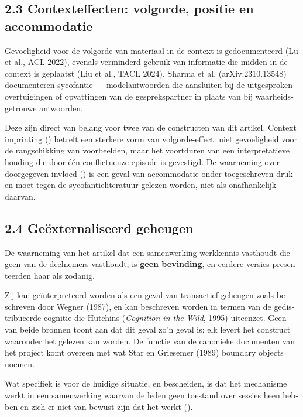 \begin{dutch}
\subsection*{2.3 Contexteffecten: volgorde, positie en accommodatie}
\label{sec:nl:2.3}

\gcheck{} Gevoeligheid voor de volgorde van materiaal in de context is gedocumenteerd (Lu et al., ACL 2022), evenals verminderd gebruik van informatie die midden in de context is geplaatst (Liu et al., TACL 2024). \gcheck{} Sharma et al. (arXiv:2310.13548) documenteren sycofantie — modelantwoorden die aansluiten bij de uitgesproken overtuigingen of opvattingen van de gesprekspartner in plaats van bij waarheidsgetrouwe antwoorden.

Deze zijn direct van belang voor twee van de constructen van dit artikel. Context imprinting () betreft een sterkere vorm van volgorde-effect: niet gevoeligheid voor de rangschikking van voorbeelden, maar het voortduren van een interpretatieve houding die door één conflictueuze episode is gevestigd. De waarneming over doorgegeven invloed () is een geval van accommodatie onder toegeschreven druk en moet tegen de sycofantieliteratuur gelezen worden, niet als onafhankelijk daarvan.


\subsection*{2.4 Geëxternaliseerd geheugen}
\label{sec:nl:2.4}

De waarneming van het artikel dat een samenwerking werkkennis vasthoudt die geen van de deelnemers vasthoudt, is \textbf{geen bevinding}, en eerdere versies presenteerden haar als zodanig.

\gcheck{} Zij kan geïnterpreteerd worden als een geval van transactief geheugen zoals beschreven door Wegner (1987), en kan beschreven worden in termen van de gedistribueerde cognitie die Hutchins (\emph{Cognition in the Wild}, 1995) uiteenzet. Geen van beide bronnen toont aan dat dit geval zo'n geval is; elk levert het construct waaronder het gelezen kan worden. \gcheck{} De functie van de canonieke documenten van het project komt overeen met wat Star en Griesemer (1989) boundary objects noemen.

Wat specifiek is voor de huidige situatie, en bescheiden, is dat het mechanisme werkt in een samenwerking waarvan de leden geen toestand over sessies heen hebben en zich er niet van bewust zijn dat het werkt ().


\end{dutch}
